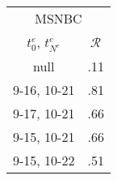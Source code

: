 \begin{tabular}{cc}
    \toprule
    \multicolumn{2}{c}{MSNBC} \\
    $t_0^e$, $t_{N^e}^e$ & $\mathcal{R}$ \\
    \midrule
    null   &     .11 \\
    9-16, 10-21   &     .81 \\
    9-17, 10-21   &     .66 \\
    9-15, 10-21   &     .66 \\
    9-15, 10-22   &     .51 
\end{tabular}

